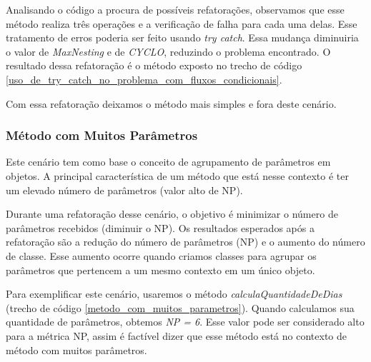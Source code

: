                
                                                                                          
Analisando o código a procura de possíveis refatorações, observamos que esse método realiza três operações e a verificação de falha para cada uma delas. Esse tratamento de erros poderia ser feito usando \textit{try catch}. Essa mudança diminuiria o valor de \textit{MaxNesting} e de \textit{CYCLO}, reduzindo o problema encontrado. O resultado dessa refatoração é o método exposto no trecho de código \ref{uso_de_try_catch_no_problema_com_fluxos_condicionais}.
                                                         

              
Com essa refatoração deixamos o método mais simples e fora deste cenário.


\subsubsection{Método com Muitos Parâmetros}
                                                                         
Este cenário tem como base o conceito de agrupamento de parâmetros em objetos. A principal característica de um método que está nesse contexto é ter um elevado número de parâmetros (valor alto de NP).
                                                         
Durante uma refatoração desse cenário, o objetivo é minimizar o número de parâmetros recebidos (diminuir o NP). Os resultados esperados após a refatoração são a redução do número de parâmetros (NP) e o aumento do número de classe. Esse aumento ocorre quando criamos classes para agrupar os parâmetros que pertencem a um mesmo contexto em um único objeto.
	                                               
Para exemplificar este cenário, usaremos o método \textit{calculaQuantidadeDeDias} (trecho de código \ref{metodo_com_muitos_parametros}). Quando calculamos sua quantidade de parâmetros, obtemos \textit{NP = 6}. Esse valor pode ser considerado alto para a métrica NP, assim é factível dizer que esse método está no contexto de método com muitos parâmetros.                    	

